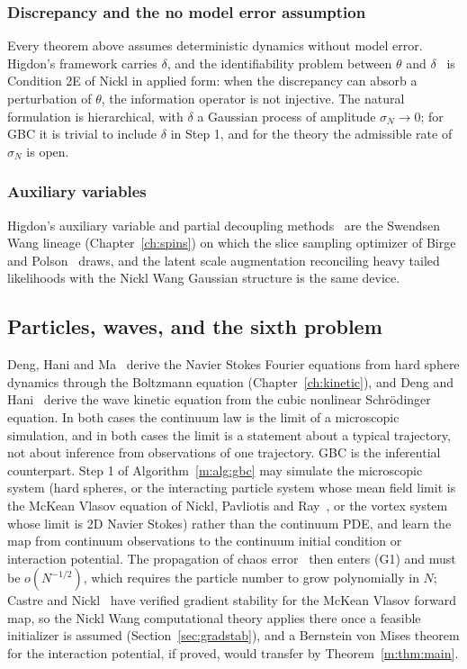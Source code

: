 \subsubsection{Discrepancy and the no model error assumption} Every theorem above assumes deterministic dynamics without model error. Higdon's framework carries $\delta$, and the identifiability problem between $\theta$ and $\delta$~\cite{brynjarsdottirohagan2014,tuowu2016} is Condition 2E of Nickl in applied form: when the discrepancy can absorb a perturbation of $\theta$, the information operator is not injective. The natural formulation is hierarchical, with $\delta$ a Gaussian process of amplitude $\sigma_N\to0$; for GBC it is trivial to include $\delta$ in Step 1, and for the theory the admissible rate of $\sigma_N$ is open.

\subsubsection{Auxiliary variables} Higdon's auxiliary variable and partial decoupling methods~\cite{higdon1998b,besag1995} are the Swendsen Wang lineage (Chapter~\ref{ch:spins}) on which the slice sampling optimizer of Birge and Polson~\cite{birgepolson2012} draws, and the latent scale augmentation reconciling heavy tailed likelihoods with the Nickl Wang Gaussian structure is the same device.

\subsection{Particles, waves, and the sixth problem}\label{m:sec:hilbert}

Deng, Hani and Ma~\cite{denghanima2025} derive the Navier Stokes Fourier equations from hard sphere dynamics through the Boltzmann equation (Chapter~\ref{ch:kinetic}), and Deng and Hani~\cite{denghani2023} derive the wave kinetic equation from the cubic nonlinear Schr\"odinger equation. In both cases the continuum law is the limit of a microscopic simulation, and in both cases the limit is a statement about a typical trajectory, not about inference from observations of one trajectory. GBC is the inferential counterpart. Step 1 of Algorithm~\ref{m:alg:gbc} may simulate the microscopic system (hard spheres, or the interacting particle system whose mean field limit is the McKean Vlasov equation of Nickl, Pavliotis and Ray~\cite{nickl2025}, or the vortex system whose limit is 2D Navier Stokes) rather than the continuum PDE, and learn the map from continuum observations to the continuum initial condition or interaction potential. The propagation of chaos error~\cite{sznitman1991} then enters (G1) and must be $o(N^{-1/2})$, which requires the particle number to grow polynomially in $N$; Castre and Nickl~\cite{castrenickl2026} have verified gradient stability for the McKean Vlasov forward map, so the Nickl Wang computational theory applies there once a feasible initializer is assumed (Section~\ref{sec:gradstab}), and a Bernstein von Mises theorem for the interaction potential, if proved, would transfer by Theorem~\ref{m:thm:main}.

